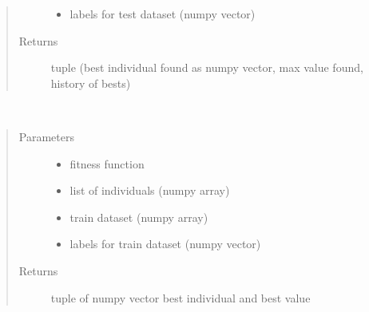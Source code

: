 \documentclass[letterpaper,10pt,english]{sphinxmanual}
\begin{document}
\begin{fulllineitems}
\begin{fulllineitems}
\begin{quote}
\begin{description}
\begin{itemize}
\item {} 
 \textendash{} labels for test dataset (numpy vector)

\end{itemize}

\item[{Returns}] \leavevmode
tuple (best individual found as numpy vector, max value found, history of bests)

\end{description}\end{quote}

\end{fulllineitems}


\begin{fulllineitems}
\label{\detokenize{index:genetic_optimizer.GeneticNeuralWeightOptimizer.best_of_generation}}~\begin{quote}\begin{description}
\item[{Parameters}] \leavevmode\begin{itemize}
\item {} 
 \textendash{} fitness function

\item {} 
 \textendash{} list of individuals (numpy array)

\item {} 
 \textendash{} train dataset (numpy array)

\item {} 
 \textendash{} labels for train dataset (numpy vector)

\end{itemize}

\item[{Returns}] \leavevmode
tuple of numpy vector best individual and best value

\end{description}\end{quote}


\end{fulllineitems}
\end{fulllineitems}
\end{document}
